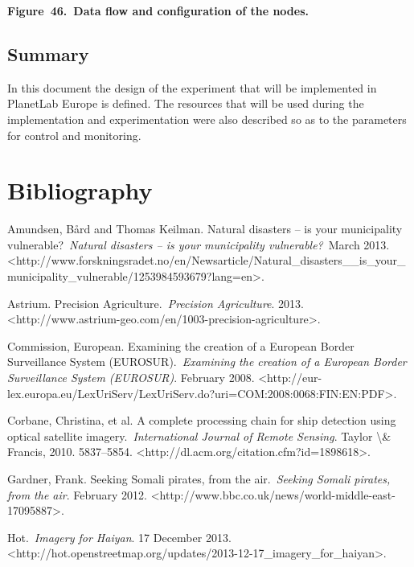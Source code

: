 \documentclass[a4paper]{article}
\begin{document}
{\centering\bfseries
Figure\ 46.\ Data flow and configuration of the nodes.
\par}

\subsection[Summary]{Summary}
\hypertarget{Toc381777257}{}In this document the design of the
experiment that will be implemented in PlanetLab Europe is defined. The
resources that will be used during the implementation and
experimentation were also described so as to the parameters for control
and monitoring.\ 

\section[Bibliography]{Bibliography}
\hypertarget{Toc381777258}{}\label{bkm:Ref378931932}
\bigskip

Amundsen, B{\aa}rd and Thomas Keilman. {\textquotedbl}Natural disasters
-- is your municipality vulnerable?{\textquotedbl}\ \textit{Natural
disasters -- is your municipality vulnerable?}\ March 2013.
{\textless}http://www.forskningsradet.no/en/Newsarticle/Natural\_disasters\_\_is\_your\_municipality\_vulnerable/1253984593679?lang=en{\textgreater}.

Astrium. {\textquotedbl}Precision
Agriculture.{\textquotedbl}\ \textit{Precision Agriculture}. 2013.
{\textless}http://www.astrium-geo.com/en/1003-precision-agriculture{\textgreater}.

Commission, European. {\textquotedbl}Examining the creation of a
European Border Surveillance System
(EUROSUR).{\textquotedbl}\ \textit{Examining the creation of a European
Border Surveillance System (EUROSUR)}. February 2008.
{\textless}http://eur-lex.europa.eu/LexUriServ/LexUriServ.do?uri=COM:2008:0068:FIN:EN:PDF{\textgreater}.

Corbane, Christina, et al. {\textquotedbl}A complete processing chain
for ship detection using optical satellite
imagery.{\textquotedbl}\ \textit{International Journal of Remote
Sensing}. Taylor {\textbackslash}\& Francis, 2010. 5837--5854.
{\textless}http://dl.acm.org/citation.cfm?id=1898618{\textgreater}.

Gardner, Frank. {\textquotedbl}Seeking Somali pirates, from the
air.{\textquotedbl}\ \textit{Seeking Somali pirates, from the air}.
February 2012.
{\textless}http://www.bbc.co.uk/news/world-middle-east-17095887{\textgreater}.

Hot.\ \textit{Imagery for Haiyan}. 17 December 2013.
{\textless}http://hot.openstreetmap.org/updates/2013-12-17\_imagery\_for\_haiyan{\textgreater}.
\end{document}
